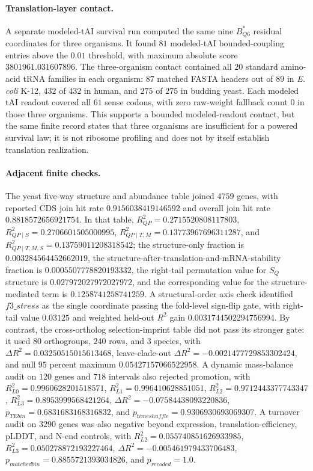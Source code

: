 \paragraph{Translation-layer contact.}
A separate modeled-tAI survival run computed the same nine $B^{*}_{Q6}$ residual coordinates for three organisms. It found $81$ modeled-tAI bounded-coupling entries above the $0.01$ threshold, with maximum absolute score $3801961.031607896$. The three-organism contact contained all $20$ standard amino-acid tRNA families in each organism: $87$ matched FASTA headers out of $89$ in \emph{E. coli} K-12, $432$ of $432$ in human, and $275$ of $275$ in budding yeast. Each modeled tAI readout covered all $61$ sense codons, with zero raw-weight fallback count $0$ in those three organisms. This supports a bounded modeled-readout contact, but the same finite record states that three organisms are insufficient for a powered survival law; it is not ribosome profiling and does not by itself establish translation realization.

\paragraph{Adjacent finite checks.}
The yeast five-way structure and abundance table joined $4759$ genes, with reported CDS join hit rate $0.9156038419146592$ and overall join hit rate $0.8818572656921754$. In that table, $R^2_{QP}=0.2715520808117803$, $R^2_{QP\mid S}=0.2706601505000995$, $R^2_{QP\mid T,M}=0.13773967696311287$, and $R^2_{QP\mid T,M,S}=0.13759011208318542$; the structure-only fraction is $0.003284564452662019$, the structure-after-translation-and-mRNA-stability fraction is $0.0005507778820193332$, the right-tail permutation value for $S_Q$ structure is $0.027972027972027972$, and the corresponding value for the structure-mediated term is $0.1258741258741259$. A structural-order axis check identified $f3\_stress$ as the single coordinate passing the fold-level sign-flip gate, with right-tail value $0.03125$ and weighted held-out $R^2$ gain $0.0031744502294756994$. By contrast, the cross-ortholog selection-imprint table did not pass its stronger gate: it used $80$ orthogroups, $240$ rows, and $3$ species, with $\Delta R^2=0.03250515015613468$, leave-clade-out $\Delta R^2=-0.0021477729853302424$, and null $95$ percent maximum $0.05427157066522958$. A dynamic mass-balance audit on $120$ genes and $718$ intervals also rejected promotion, with $R^2_{L0}=0.9960628201518571$, $R^2_{L1}=0.996410628851051$, $R^2_{L2}=0.9712443377743347$, $R^2_{L3}=0.8953999568421264$, $\Delta R^2=-0.07584438093220836$, $p_{TEbin}=0.6831683168316832$, and $p_{timeshuffle}=0.9306930693069307$. A turnover audit on $3290$ genes was also negative beyond expression, translation-efficiency, pLDDT, and N-end controls, with $R^2_{L2}=0.055740851626933985$, $R^2_{L3}=0.050278872193227464$, $\Delta R^2=-0.005461979433706483$, $p_{matchedbin}=0.8855721393034826$, and $p_{recoded}=1.0$.

